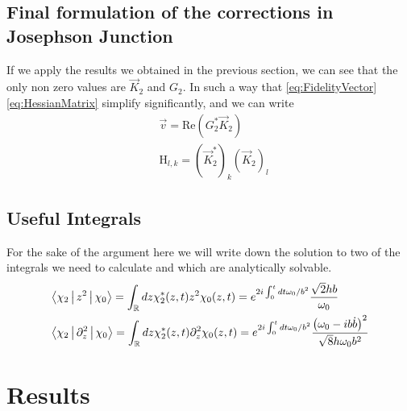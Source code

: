 \documentclass{article}
\begin{document}
\subsection{Final formulation of the corrections in Josephson Junction}
If we apply the results we obtained in the previous section, we can see that the only non zero values are $ \vec{ K }_{2} $ and $ G_{2} $.
In such a way that \cref{eq:FidelityVector} \cref{eq:HessianMatrix} simplify significantly, and we can write
\begin{align}
	 & \vec{v} = \text{Re}(G_{2}^{*}\vec{K}_{2}) \label{eq:FidelityVectorSimple}                                            \\
	 & \mathrm{H}_{l,k} = \left(  \vec{K}^{*}_{2} \right)_{k}\left(  \vec{K}_{2} \right)_{l} \label{eq:HessianMatrixSimple}
\end{align}

\subsection{Useful Integrals} %
For the sake of the argument here we will write down the solution to two of the integrals we need to calculate and which are analytically solvable.
\begin{align}
	 & \Braket{\chi_{2}|z^2|\chi_{0}} =
	\int_{\mathbb{R}}dz \chi_{2}^{*}(z,t) z^2 \chi_{0}(z,t) =
	e^{2i\int_{0}^{t}dt\omega_{0}/b^2 }\frac{\sqrt{2}h b   }{\omega_0} \\
	 & \Braket{\chi_{2}|\partial_z^2|\chi_{0}} =
	\int_{\mathbb{R}}dz \chi_{2}^{*}(z,t) \partial_z^2 \chi_{0}(z,t)=
	e^{2i\int_{0}^{t}dt\omega_{0}/b^2 }\frac{\left(\omega_0 - ib\dot{b}\right)^2}{ \sqrt{8} h\omega_0b^2 }
\end{align}
\newpage
\section{Results}
\end{document}
